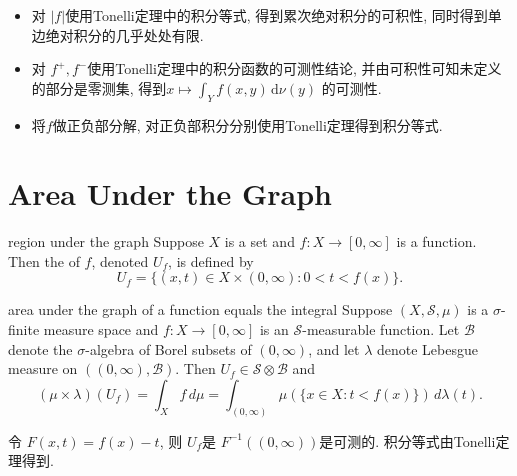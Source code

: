 \documentclass[../main.tex]{subfiles}
\begin{document}
\begin{proofsketch}
  \begin{itemize}
    \item 对 \(  \left| f \right|   \)使用Tonelli定理中的积分等式, 得到累次绝对积分的可积性, 同时得到单边绝对积分的几乎处处有限.
    \item 对 \(  f^{+ }, f^{-}  \)使用Tonelli定理中的积分函数的可测性结论, 并由可积性可知未定义的部分是零测集,  得到\(  x\mapsto  \int_{Y}f\left( x,y \right)\,\mathrm{d} \nu \left( y \right)    \) 的可测性.
    \item 将\(  f  \)做正负部分解, 对正负部积分分别使用Tonelli定理得到积分等式.
  \end{itemize}
  
\end{proofsketch}

\section{Area Under the Graph}

\begin{definition}{region under the graph}{}
Suppose \(X\) is a set and \(f:X\to[0,\infty]\) is a function. Then the  of \(f\), denoted \(U_f\), is defined by
\[
U_f=\{(x,t)\in X\times(0,\infty):0<t<f(x)\}.
\]
\end{definition}

\begin{proposition}{area under the graph of a function equals the integral}{}
Suppose \((X,\mathcal{S},\mu)\) is a \(\sigma\)-finite measure space and \(f:X\to[0,\infty]\) is an \(\mathcal{S}\)-measurable function. Let \(\mathcal{B}\) denote the \(\sigma\)-algebra of Borel subsets of \((0,\infty)\), and let \(\lambda\) denote Lebesgue measure on \(((0,\infty),\mathcal{B})\). Then \(U_f\in\mathcal{S}\otimes\mathcal{B}\) and
\[
(\mu\times\lambda)(U_f)=\int_X f\,d\mu=\int_{(0,\infty)}\mu(\{x\in X:t<f(x)\})\,d\lambda(t).
\]
\end{proposition}

\begin{proofsketch}
  令 \(  F\left( x,t \right)= f\left( x \right)-t    \), 则 \(  U_{f}  \)是 \(  F^{-1} \left( \left( 0,\infty \right)  \right)   \)是可测的. 积分等式由Tonelli定理得到.   
\end{proofsketch}
\end{document}

